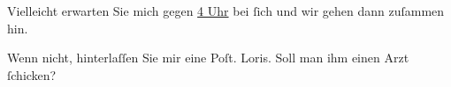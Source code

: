 \pstart
           Vielleicht erwarten Sie mich gegen \uline{4 Uhr} bei{ }ſich und
               wir gehen dann zuſammen hin.\pend
           
\pstart
           Wenn nicht, hinterlaſſen Sie mir eine Poſt.\pend
           \pstart \spacefill\mbox{Loris.}\pend{}
\pstart
           \noindent{}Soll man ihm einen Arzt{ }ſchicken?\pend
           \endnumbering{}  \newcommand{\dateiname}{L00049}\newcommand{\titel}{Hugo von Hofmannsthal an Arthur Schnitzler, [6. 12. 1891]}\newcommand{\editorInnen}{Herausgegeben von Martin Anton Müller}
